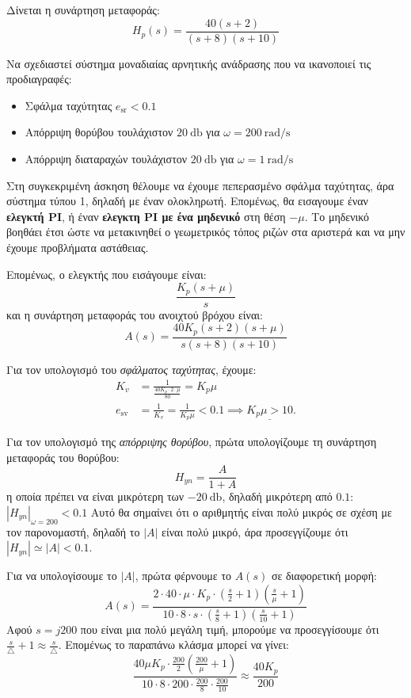 \documentclass[11pt,a4paper,notitlepage,fleqn,final]{article}
\begin{document}
\begin{exercise}
Δίνεται η συνάρτηση μεταφοράς:
\[
H_p(s) = \frac{40(s+2)}{(s+8)(s+10)}
\]

Να σχεδιαστεί σύστημα μοναδιαίας αρνητικής ανάδρασης που να ικανοποιεί τις προδιαγραφές:
\begin{itemize}
	\item Σφάλμα ταχύτητας \( e_{\mathrm{sr}} < 0.1 \)
	\item Απόρριψη θορύβου τουλάχιστον \( \SI{20}{\decibel} \) για \( \omega = \SI{200}{\radian/\second} \)
	\item Απόρριψη διαταραχών τουλάχιστον \( \SI{20}{\decibel} \) για \( \omega = \SI{1}{\radian/\second} \)
\end{itemize}

\tcblower
Στη συγκεκριμένη άσκηση θέλουμε να έχουμε πεπερασμένο σφάλμα ταχύτητας, άρα σύστημα τύπου 1,
δηλαδή με έναν ολοκληρωτή. Επομένως, θα εισαγουμε έναν \textbf{ελεγκτή PI}, ή έναν
\textbf{ελεγκτη PI με ένα μηδενικό} στη θέση \( -μ \). Το μηδενικό βοηθάει έτσι ώστε να
μετακινηθεί ο γεωμετρικός τόπος ριζών στα αριστερά και να μην έχουμε προβλήματα αστάθειας.

Επομένως, ο ελεγκτής που εισάγουμε είναι:
\[
\frac{K_p(s+μ)}{s}
\]
και η συνάρτηση μεταφοράς του ανοιχτού βρόχου είναι:
\[
A(s) = \frac{40K_p(s+2)(s+μ)}{s(s+8)(s+10)}
\]

Για τον υπολογισμό του \textit{σφάλματος ταχύτητας}, έχουμε:
\begin{align*}
	K_v &= \frac{1}{\frac{40K_p\cdot 2\cdot μ}{80}} = K_p μ\\
	e_{\mathrm{sv}} &= \frac{1}{K_v} = \frac{1}{K_p μ} < 0.1 \implies
	\underline{K_p μ > 10}.
\end{align*}

Για τον υπολογισμό της \textit{απόρριψης θορύβου}, πρώτα υπολογίζουμε τη συνάρτηση μεταφοράς
του θορύβου:
\[
H_{yn} = \frac{A}{1+A}
\]
η οποία πρέπει να είναι μικρότερη των \( \SI{-20}{\decibel} \), δηλαδή μικρότερη από \( 0.1 \): \( \left|H_{yn}\right|_{\omega=200} < 0.1 \)
Αυτό θα σημαίνει ότι ο αριθμητής είναι πολύ μικρός σε σχέση με τον παρονομαστή, δηλαδή το
\( |A| \) είναι πολύ μικρό, άρα προσεγγίζουμε ότι \( \left|H_{yn}\right| \simeq |A| < 0.1 \).

Για να υπολογίσουμε το \( \left|A\right| \), πρώτα φέρνουμε το \( A(s) \) σε διαφορετική
μορφή:
\[
A(s) = \frac{2\cdot 40 \cdot μ \cdot K_p \cdot \left(\frac{s}{2}+1\right)\left(
	\frac{s}{μ}+1
	\right)}{10\cdot 8\cdot s \cdot \left( \frac{s}{8}+1 \right)\left(\frac{s}{10}+1\right)}
\]
Αφού \( s = j200 \) που είναι μια πολύ μεγάλη τιμή, μπορούμε να προσεγγίσουμε ότι
\( \frac{s}{\triangle} + 1 \approx \frac{s}{\triangle} \). Επομένως το παραπάνω κλάσμα μπορεί
να γίνει:
\[
\frac{40μK_p\cdot \frac{200}{2}\left(\frac{200}{μ}+1\right)}{10\cdot 8 \cdot 200 \cdot\frac{200}{8}\cdot\frac{200}{10}}
\approx \frac{40K_p}{200}
\]


\end{exercise}
\end{document}
